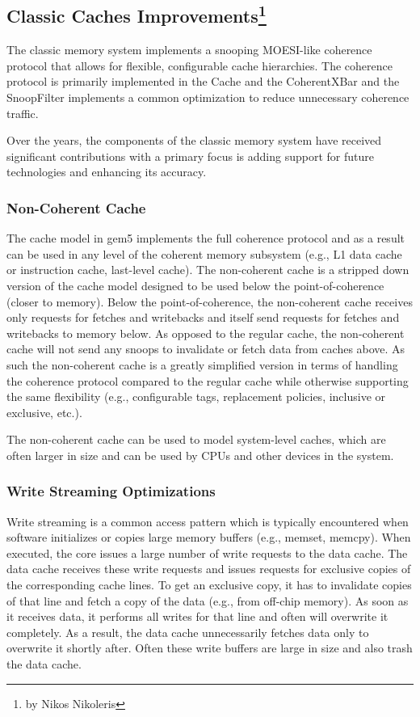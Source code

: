 \subsection[Classic Caches Improvements]{Classic Caches Improvements\footnote{by Nikos Nikoleris}}

The classic memory system implements a snooping MOESI-like coherence protocol that allows for flexible, configurable cache hierarchies.
The coherence protocol is primarily implemented in the Cache and the CoherentXBar and the SnoopFilter implements a common optimization to reduce unnecessary coherence traffic.

Over the years, the components of the classic memory system have received significant contributions with a primary focus is adding support for future technologies and enhancing its accuracy.

\subsubsection[Non-Coherent Cache]{Non-Coherent Cache}
The cache model in gem5 implements the full coherence protocol and as a result can be used in any level of the coherent memory subsystem (e.g., L1 data cache or instruction cache, last-level cache).
The non-coherent cache is a stripped down version of the cache model designed to be used below the point-of-coherence (closer to memory).
Below the point-of-coherence, the non-coherent cache receives only requests for fetches and writebacks and itself send requests for fetches and writebacks to memory below.
As opposed to the regular cache, the non-coherent cache will not send any snoops to invalidate or fetch data from caches above.
As such the non-coherent cache is a greatly simplified version in terms of handling the coherence protocol compared to the regular cache while otherwise supporting the same flexibility (e.g., configurable tags, replacement policies, inclusive or exclusive, etc.).

The non-coherent cache can be used to model system-level caches, which are often larger in size and can be used by CPUs and other devices in the system.

\subsubsection[Write Streaming Optimizations]{Write Streaming Optimizations}

Write streaming is a common access pattern which is typically encountered when software initializes or copies large memory buffers (e.g., memset, memcpy).
When executed, the core issues a large number of write requests to the data cache. The data cache receives these write requests and issues requests for exclusive copies of the corresponding cache lines. To get an exclusive copy, it has to invalidate copies of that line and fetch a copy of the data (e.g., from off-chip memory). As soon as it receives data, it performs all writes for that line and often will overwrite it completely. As a result, the data cache unnecessarily fetches data only to overwrite it shortly after. Often these write buffers are large in size and also trash the data cache.

